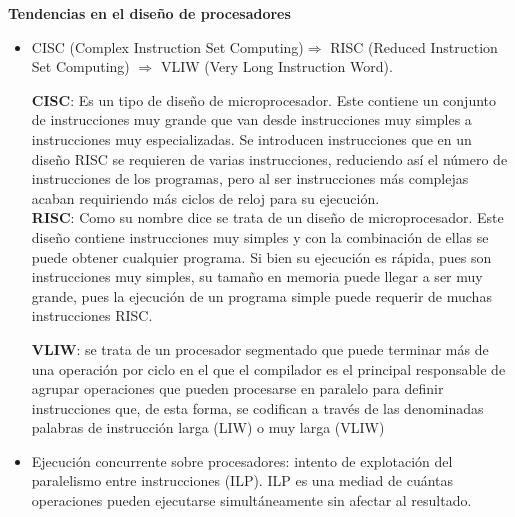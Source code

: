 \documentclass{article}
\begin{document}
\textbf{Tendencias en el diseño de procesadores}
\begin{itemize}
\item CISC (Complex Instruction Set Computing)$\Rightarrow$ RISC (Reduced Instruction Set Computing) $\Rightarrow$ VLIW (Very Long Instruction Word).

\textbf{CISC}: Es un tipo de diseño de microprocesador. Este contiene un conjunto de instrucciones muy grande que van desde instrucciones muy simples a instrucciones muy especializadas. Se introducen instrucciones que en un diseño RISC se requieren de varias instrucciones, reduciendo así el número de instrucciones de los programas, pero al ser instrucciones más complejas acaban requiriendo más ciclos de reloj para su ejecución.\\

\textbf{RISC}: Como su nombre dice se trata de un diseño de microprocesador. Este diseño contiene instrucciones muy simples y con la combinación de ellas se puede obtener cualquier programa. Si bien su ejecución es rápida, pues son instrucciones muy simples, su tamaño en memoria puede llegar a ser muy grande, pues la ejecución de un programa simple puede requerir de muchas instrucciones RISC.

\textbf{VLIW}: se trata de un procesador segmentado que puede terminar más de una operación por ciclo en el que el compilador es el principal responsable de agrupar operaciones que pueden procesarse en paralelo para definir instrucciones que, de esta forma, se codifican a través de las denominadas palabras de instrucción larga (LIW) o muy larga (VLIW)

\item Ejecución concurrente sobre procesadores: intento de explotación del paralelismo entre instrucciones (ILP). ILP es una mediad de cuántas operaciones pueden ejecutarse simultáneamente sin afectar al resultado.
\end{itemize}
\end{document}

